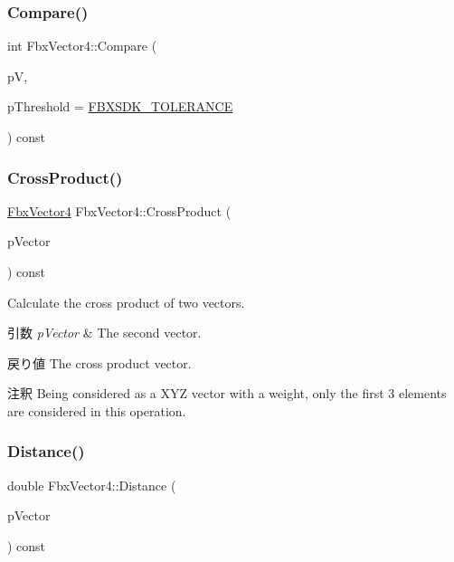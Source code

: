 \subsubsection{\texorpdfstring{Compare()}{Compare()}}
{\footnotesize\ttfamily int Fbx\+Vector4\+::\+Compare (\begin{DoxyParamCaption}\item[{const \hyperlink{class_fbx_vector4}{Fbx\+Vector4} \&}]{pV,  }\item[{const double}]{p\+Threshold = {\ttfamily \hyperlink{fbxtypes_8h_acf3cd6f208edb42ad9c9abbc1f7feea0}{F\+B\+X\+S\+D\+K\+\_\+\+T\+O\+L\+E\+R\+A\+N\+CE}} }\end{DoxyParamCaption}) const}

\mbox{\label{class_fbx_vector4_a811b7b26ede7d4306497c9ca78f4b068}} 
\subsubsection{\texorpdfstring{Cross\+Product()}{CrossProduct()}}
{\footnotesize\ttfamily \hyperlink{class_fbx_vector4}{Fbx\+Vector4} Fbx\+Vector4\+::\+Cross\+Product (\begin{DoxyParamCaption}\item[{const \hyperlink{class_fbx_vector4}{Fbx\+Vector4} \&}]{p\+Vector }\end{DoxyParamCaption}) const}

Calculate the cross product of two vectors. 
\begin{DoxyParams}{引数}
{\em p\+Vector} & The second vector. \\
\hline
\end{DoxyParams}
\begin{DoxyReturn}{戻り値}
The cross product vector. 
\end{DoxyReturn}
\begin{DoxyRemark}{注釈}
Being considered as a X\+YZ vector with a weight, only the first 3 elements are considered in this operation. 
\end{DoxyRemark}
\mbox{\label{class_fbx_vector4_a7d1010f60f73f8bd3668dcf7827421b2}} 
\subsubsection{\texorpdfstring{Distance()}{Distance()}}
{\footnotesize\ttfamily double Fbx\+Vector4\+::\+Distance (\begin{DoxyParamCaption}\item[{const \hyperlink{class_fbx_vector4}{Fbx\+Vector4} \&}]{p\+Vector }\end{DoxyParamCaption}) const}

